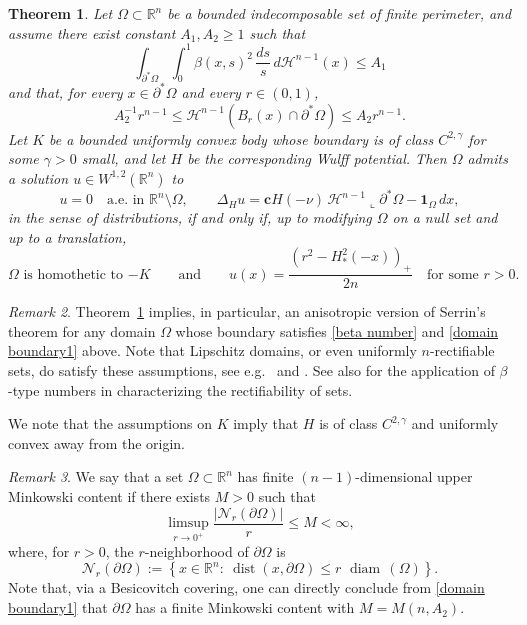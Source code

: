 \documentclass[reqno,11pt]{amsart}
\makeatletter
\def\dist{{\mathop\mathrm{dist}}}
\def\diam{{\mathop\mathrm{\,diam\,}}}
\def\dfrac{\displaystyle\frac}
\newtheorem{thm}{Theorem}[section]
\numberwithin{equation}{section}
\theoremstyle{remark}
\newtheorem{rem}[thm]{Remark}%
\makeatother
\begin{document}
\begin{thm}\label{main thm}
Let $\Omega\subset \mathbb R^n$ be a bounded indecomposable set of finite perimeter,  and assume there exist constant $A_1,A_2\geq 1$ such that 
\begin{equation}\label{beta number}
\int_{\partial^* \Omega}\int_{0}^{1} \beta(x,s)^2 \, \frac{ds} {s} \, d\mathscr H^{n-1}(x)\le A_1
\end{equation}
and that, for every $x\in \partial^* \Omega$ and every $r \in (0,1)$,
\begin{equation}\label{domain boundary1}
A_2^{-1}r^{n-1}\le \mathscr H^{n-1}(B_r(x)\cap \partial^* \Omega)\le A_2 r^{n-1}.
\end{equation}
Let $K$ be a bounded uniformly convex body whose boundary is of class
$C^{2,\gamma}$ for some $\gamma>0$ small, and let $H$ be the corresponding Wulff potential.
Then $\Omega$ admits a solution $u\in W^{1,2}(\mathbb R^n)$ to
\begin{equation}\label{eq:weak set finite per}
u=0\quad \text{a.e.\ in }\mathbb R^n\setminus \Omega,\qquad
\Delta_H u=\mathbf{c}H(-\nu)\,\mathscr{H}^{n-1}\llcorner \partial^*\Omega - \mathbf{1}_{\Omega}\,dx,
\end{equation}
in the sense of distributions, if and only if, {up to modifying $\Omega$ on a null set and up to a translation,} 
\[
{
\text{$\Omega$ is homothetic to $-K$}\qquad \text{and}\qquad
u(x)=\dfrac{(r^2-H_*^2(-x))_+}{2n}\quad \text{for some }r>0.
}
\]
\end{thm}

\begin{rem}
Theorem~\ref{main thm} implies, in particular, an anisotropic version of Serrin's theorem for any domain $\Omega$ whose boundary
satisfies \eqref{beta number} and \eqref{domain boundary1} above. Note that Lipschitz domains, or even uniformly $n$-rectifiable sets, do satisfy these assumptions, see e.g.\ \cite{DS1991} and
\cite[Proposition~III.4.2]{DS1993}. See also \cite{T2015, AT2015} for the application of $\beta$-type numbers in characterizing the rectifiability of sets. 

We note that the assumptions on $K$ imply that $H$ is of class $C^{2,\gamma}$ and uniformly convex away from the origin.
\end{rem}

\begin{rem}
We say that a set $\Omega\subset\mathbb R^n$ has finite $(n-1)$-dimensional upper Minkowski content if there exists $M>0$ such that
\begin{equation}\label{eq:minkowski-content}
    {\limsup_{r\to 0^+} \frac{|\mathcal N_{r}(\partial\Omega)|}{r}\le M<\infty,}
\end{equation}
where, for $r>0$, the $r$-neighborhood of $\partial\Omega$ is
\[
\mathcal N_r(\partial\Omega):=\left\{ x\in \mathbb R^n:\ \dist(x,\partial \Omega)\le r\,\diam(\Omega) \right\}.
\]
Note that, via a Besicovitch covering, one can directly conclude from \eqref{domain boundary1} that $\partial \Omega$ has a finite
Minkowski content with $M=M(n,A_2)$.
\end{rem}
\end{document}
